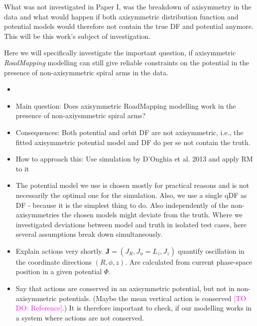 \documentclass[iop,revtex4,numberedappendix,appendixfloats]{emulateapj}
\newcommand{\vect}[1]{\boldsymbol{#1}}
\newcommand{\RM}{{\sl RoadMapping}}
\newcommand{\Wilma}[1]{\textcolor{Magenta}{#1}}
\begin{document}
What was not investigated in Paper I, was the breakdown of axisymmetry in the data and what would happen if both axisymmetric distribution function and potential models would therefore not contain the true DF and potential anymore. This will be this work's subject of investigation.

Here we will specifically investigate the important question, if axisymmetric \RM{} modelling can still give reliable constraints on the potential in the presence of non-axisymmetric spiral arms in the data.


\begin{itemize}
\item 
\item Main question: Does axisymmetric RoadMapping modelling work in the presence of non-axiysmmetric spiral arms?
\item Consequences: Both potential and orbit DF are not axisymmetric, i.e., the fitted axisymmetric potential model and DF do per se not contain the truth.
\item How to approach this: Use simulation by D'Onghia et al. 2013 and apply RM to it
\item The potential model we use is chosen mostly for practical reasons and is not necessarily the optimal one for the simulation. Also, we use a single qDF as DF - because it is the simplest thing to do. Also independently of the non-axisymmetries the chosen models might deviate from the truth. Where we investigated deviations between model and truth in isolated test cases, here several assumptions break down simultaneously.
\item Explain actions very shortly. $\vect{J}=(J_R,J_\phi=L_z,J_z)$ quantify oscillation in the coordinate directions $(R,\phi,z)$. Are calculated from current phase-space position in a given potential $\Phi$.
\item Say that actions are conserved in an axisymmetric potential, but not in non-axisymmetric potentials. (Maybe the mean vertical action is conserved \Wilma{[TO DO: Reference]}.) It is therefore important to check, if our modelling works in a system where actions are not conserved.
\end{itemize}

\end{document}
